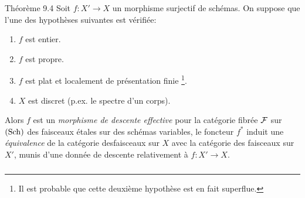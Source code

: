 \documentclass[10pt]{../fichiers-configuration-latex/smfart}
\begin{document}
\begin{enonce*}{Théorème 9.4}
Soit $f:X'\rightarrow X$ un morphisme surjectif de schémas. On suppose
que l'une des hypothèses suivantes est vérifiée:
\begin{enumerate}
\renewcommand{\theenumi}{\alph{enumi}}
\renewcommand{\labelenumi}{\theenumi)}
\item $f$ est entier.

\item $f$ est propre.

\item $f$ est plat et localement de présentation finie \footnote[1]{Il
est probable que cette deuxième hypothèse est en fait superflue.}.

\item $X$ est discret (p.ex. le spectre d'un corps).
\end{enumerate}

Alors $f$ est un \emph{morphisme de descente effective} pour la
catégorie fibrée ${\mathcal F}$ sur $(\operatorname{Sch})$ des faisceaux étales
sur des schémas variables, \ie le foncteur $f^{\ast}$ induit une
\emph{équivalence} de la catégorie des\pageoriginale  faisceaux sur $X$
avec la catégorie des faisceaux sur $X'$, munis d'une donnée de
descente relativement à $f:X'\rightarrow X$.
\end{enonce*}

\setcounter{subsection}{4}
\setcounter{subsubsection}{0}
\subsubsection{}
\end{document}
